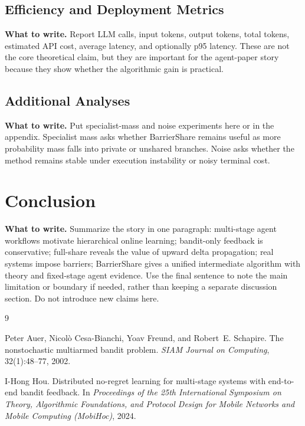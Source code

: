 \documentclass{article}
\newcommand{\towrite}[1]{\noindent\textbf{What to write.} #1}
\begin{document}
\subsection{Efficiency and Deployment Metrics}

\towrite{Report LLM calls, input tokens, output tokens, total tokens, estimated API cost, average latency, and optionally p95 latency. These are not the core theoretical claim, but they are important for the agent-paper story because they show whether the algorithmic gain is practical.}

\subsection{Additional Analyses}

\towrite{Put specialist-mass and noise experiments here or in the appendix. Specialist mass asks whether BarrierShare remains useful as more probability mass falls into private or unshared branches. Noise asks whether the method remains stable under execution instability or noisy terminal cost.}

\section{Conclusion}

\towrite{Summarize the story in one paragraph: multi-stage agent workflows motivate hierarchical online learning; bandit-only feedback is conservative; full-share reveals the value of upward delta propagation; real systems impose barriers; BarrierShare gives a unified intermediate algorithm with theory and fixed-stage agent evidence. Use the final sentence to note the main limitation or boundary if needed, rather than keeping a separate discussion section. Do not introduce new claims here.}

\begin{thebibliography}{9}

Peter Auer, Nicol\`o Cesa-Bianchi, Yoav Freund, and Robert~E. Schapire.
\newblock The nonstochastic multiarmed bandit problem.
\newblock \emph{SIAM Journal on Computing}, 32(1):48--77, 2002.

I-Hong Hou.
\newblock Distributed no-regret learning for multi-stage systems with end-to-end bandit feedback.
\newblock In \emph{Proceedings of the 25th International Symposium on Theory, Algorithmic Foundations, and Protocol Design for Mobile Networks and Mobile Computing (MobiHoc)}, 2024.

\end{thebibliography}
\end{document}
